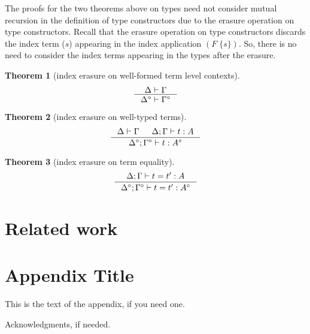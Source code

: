 \documentclass[preprint]{sigplanconf}
\theoremstyle{plain}
\newtheorem{theorem}{Theorem}
\theoremstyle{remark}
\theoremstyle{definition}
\begin{document}
The proofs for the two theorems above on types need not consider
mutual recursion in the definition of type constructors due to
the erasure operation on type constructors. Recall that
the erasure operation on type constructors discards the index term ($s$)
appearing in the index application $(F\;\{s\})$. So, there is no need to
consider the index terms appearing in the types after the erasure.

\begin{theorem}[index erasure on well-formed term level contexts]
\label{thm:ierasetmctx}
\[ \inference{\Delta |- \Gamma}{\Delta^\circ |- \Gamma^\circ} \]
\end{theorem}

\begin{theorem}[index erasure on well-typed terms]
\label{thm:ierasetyping}
\[ \inference{\Delta |- \Gamma & \Delta;\Gamma |- t : A}
		{\Delta^\circ;\Gamma^\circ |- t : A^\circ}
\]
\end{theorem}


\begin{theorem}[index erasure on term equality]
\[ \inference{\Delta;\Gamma |- t=t':A}
 	{\Delta^\circ;\Gamma^\circ |- t=t':A^\circ}
\]
\end{theorem}

\section{Related work}

\appendix
\section{Appendix Title}

This is the text of the appendix, if you need one.

\acks

Acknowledgments, if needed.






\end{document}
